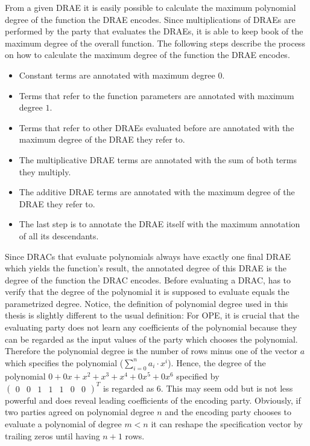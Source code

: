 \label{sec:max-poly-degree}

From a given DRAE it is easily possible to calculate the maximum polynomial
degree of the function the DRAE encodes. Since multiplications of DRAEs are
performed by the party that evaluates the DRAEs, it is able to keep book of the
maximum degree of the overall function. The following steps describe the process
on how to calculate the maximum degree of the function the DRAE encodes.

\begin{itemize}

  \item Constant terms are annotated with maximum degree $0$.

  \item Terms that refer to the function parameters are annotated with maximum
    degree $1$.

  \item Terms that refer to other DRAEs evaluated before are annotated with the
    maximum degree of the DRAE they refer to.

  \item The multiplicative DRAE terms are annotated with the sum of both terms
    they multiply.

  \item The additive DRAE terms are annotated with the maximum degree of the
    DRAE they refer to.

  \item The last step is to annotate the DRAE itself with the maximum annotation
    of all its descendants.

\end{itemize}

\noindent{}Since DRACs that evaluate polynomials always have exactly one final
DRAE which yields the function's result, the annotated degree of this DRAE is
the degree of the function the DRAC encodes. Before evaluating a DRAC, \JWpTwo{}
has to verify that the degree of the polynomial it is supposed to evaluate
equals the parametrized degree.  Notice, the definition of polynomial degree
used in this thesis is slightly different to the usual definition: For OPE, it
is crucial that the evaluating party does not learn any coefficients of the
polynomial because they can be regarded as the input values of the party which
chooses the polynomial.  Therefore the polynomial degree is the number of rows
minus one of the vector $a$ which specifies the polynomial ($\sum_{i=0}^n
a_i\cdot x^i$). Hence, the degree of the polynomial $0 + 0x + x^2 + x^3 + x^4 +
0x^5 + 0x^6$ specified by $\begin{pmatrix}0&0&1&1&1&0&0\end{pmatrix}^T$ is
regarded as $6$.  This may seem odd but is not less powerful and does reveal
leading coefficients of the encoding party. Obviously, if two parties agreed on
polynomial degree $n$ and the encoding party chooses to evaluate a polynomial of
degree $m < n$ it can reshape the specification vector by trailing zeros until
having $n+1$ rows.

